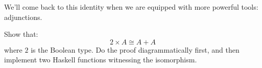 \documentclass[DaoFP]{subfiles}
\begin{document}
We'll come back to this identity when we are equipped with more powerful tools: adjunctions.

\begin{exercise}
Show that:
\[ 2 \times A \cong A + A \]
where $2$ is the Boolean type. Do the proof diagrammatically first, and then implement two Haskell functions witnessing the isomorphism.
\end{exercise}
\end{document}
